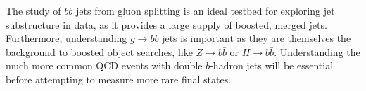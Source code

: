 
   The study of $b\bar{b}$ jets from gluon splitting is an ideal testbed for exploring jet substructure in data, as it provides a large supply of boosted, merged jets. Furthermore, understanding $g\rightarrow b \bar{b}$ jets is important as they are themselves the background to boosted object searches, like $Z\rightarrow b\bar{b}$ or $H\rightarrow b \bar{b}$.  %
Understanding the much more common QCD events with double $b$-hadron jets will be essential before attempting to measure more rare final states.






